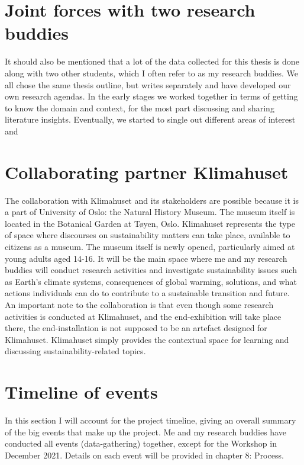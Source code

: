 

\section{Joint forces with two research buddies}
It should also be mentioned that a lot of the data collected for this thesis is done along with two other students, which I often refer to as my research buddies. We all chose the same thesis outline, but writes separately and have developed our own research agendas. In the early stages we worked together in terms of getting to know the domain and context, for the most part discussing and sharing literature insights. Eventually, we started to single out different areas of interest and 

\section{Collaborating partner Klimahuset}

The collaboration with Klimahuset and its stakeholders are possible because it is a part of University of Oslo: the Natural History Museum. The museum itself is located in the Botanical Garden at Tøyen, Oslo. Klimahuset represents the type of space where discourses on sustainability matters can take place, available to citizens as a museum. The museum itself is newly opened, particularly aimed at young adults aged 14-16. It will be the main space where me and my research buddies will conduct research activities and investigate sustainability issues such as Earth’s climate systems, consequences of global warming, solutions, and what actions individuals can do to contribute to a sustainable transition and future. An important note to the collaboration is that even though some research activities is conducted at Klimahuset, and the end-exhibition will take place there, the end-installation is not supposed to be an artefact designed for Klimahuset. Klimahuset simply provides the contextual space for learning and discussing sustainability-related topics.


\section{Timeline of events}
In this section I will account for the project timeline, giving an overall summary of the big events that make up the project. Me and my research buddies have conducted all events (data-gathering) together, except for the Workshop in December 2021. Details on each event will be provided in chapter 8: Process. 

